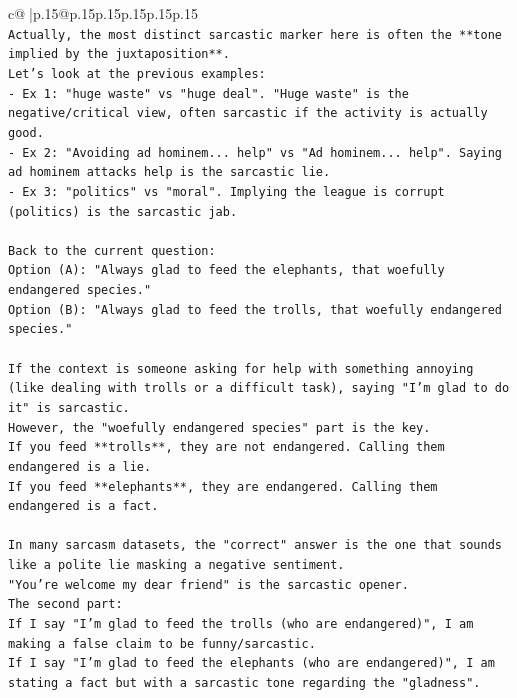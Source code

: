 \documentclass{article}
\begin{document}
{\begin{supertabular}{c@{$\;$}|p{.15\linewidth}@{}p{.15\linewidth}p{.15\linewidth}p{.15\linewidth}p{.15\linewidth}p{.15\linewidth}}
{{{\\ 
\texttt{Actually, the most distinct sarcastic marker here is often the **tone implied by the juxtaposition**.} \\
\texttt{Let's look at the previous examples:} \\
\texttt{{-} Ex 1: "huge waste" vs "huge deal". "Huge waste" is the negative/critical view, often sarcastic if the activity is actually good.} \\
\texttt{{-} Ex 2: "Avoiding ad hominem... help" vs "Ad hominem... help". Saying ad hominem attacks help is the sarcastic lie.} \\
\texttt{{-} Ex 3: "politics" vs "moral". Implying the league is corrupt (politics) is the sarcastic jab.} \\
\\ 
\texttt{Back to the current question:} \\
\texttt{Option (A): "Always glad to feed the elephants, that woefully endangered species."} \\
\texttt{Option (B): "Always glad to feed the trolls, that woefully endangered species."} \\
\\ 
\texttt{If the context is someone asking for help with something annoying (like dealing with trolls or a difficult task), saying "I'm glad to do it" is sarcastic.} \\
\texttt{However, the "woefully endangered species" part is the key.} \\
\texttt{If you feed **trolls**, they are not endangered. Calling them endangered is a lie.} \\
\texttt{If you feed **elephants**, they are endangered. Calling them endangered is a fact.} \\
\\ 
\texttt{In many sarcasm datasets, the "correct" answer is the one that sounds like a polite lie masking a negative sentiment.} \\
\texttt{"You're welcome my dear friend" is the sarcastic opener.} \\
\texttt{The second part:} \\
\texttt{If I say "I'm glad to feed the trolls (who are endangered)", I am making a false claim to be funny/sarcastic.} \\
\texttt{If I say "I'm glad to feed the elephants (who are endangered)", I am stating a fact but with a sarcastic tone regarding the "gladness".} \\
\\ 
}}}
\end{supertabular}}
\end{document}
